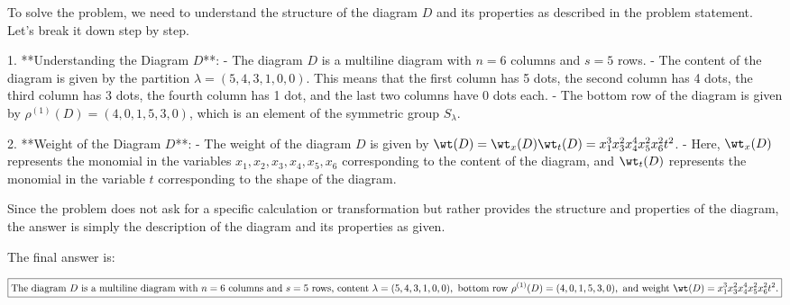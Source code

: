 To solve the problem, we need to understand the structure of the diagram \( D \) and its properties as described in the problem statement. Let's break it down step by step.

1. **Understanding the Diagram \( D \)**:
   - The diagram \( D \) is a multiline diagram with \( n = 6 \) columns and \( s = 5 \) rows.
   - The content of the diagram is given by the partition \(\lambda = (5, 4, 3, 1, 0, 0)\). This means that the first column has 5 dots, the second column has 4 dots, the third column has 3 dots, the fourth column has 1 dot, and the last two columns have 0 dots each.
   - The bottom row of the diagram is given by \(\rho^{(1)}(D) = (4, 0, 1, 5, 3, 0)\), which is an element of the symmetric group \(S_\lambda\).

2. **Weight of the Diagram \( D \)**:
   - The weight of the diagram \( D \) is given by \(\wt(D) = \wt_x(D) \wt_t(D) = x_1^3 x_3^2 x_4^4 x_5^2 x_6^2 t^2\).
   - Here, \(\wt_x(D)\) represents the monomial in the variables \(x_1, x_2, x_3, x_4, x_5, x_6\) corresponding to the content of the diagram, and \(\wt_t(D)\) represents the monomial in the variable \(t\) corresponding to the shape of the diagram.

Since the problem does not ask for a specific calculation or transformation but rather provides the structure and properties of the diagram, the answer is simply the description of the diagram and its properties as given.

The final answer is:

\[
\boxed{\text{The diagram } D \text{ is a multiline diagram with } n = 6 \text{ columns and } s = 5 \text{ rows, content } \lambda = (5, 4, 3, 1, 0, 0), \text{ bottom row } \rho^{(1)}(D) = (4, 0, 1, 5, 3, 0), \text{ and weight } \wt(D) = x_1^3 x_3^2 x_4^4 x_5^2 x_6^2 t^2.}
\]